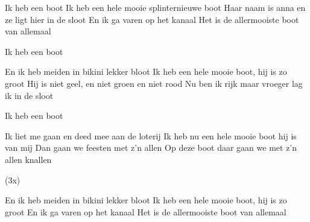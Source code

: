 
\begin{guitar}
	Ik heb een boot
	Ik heb een hele mooie splinternieuwe boot
	Haar naam is anna en ze ligt hier in de sloot
	En ik ga varen op het kanaal
	Het is de allermooiste boot van allemaal

	Ik heb een boot
	 

	En ik heb meiden in bikini lekker bloot
	Ik heb een hele mooie boot, hij is zo groot
	Hij is niet geel, en niet groen en niet rood
	Nu ben ik rijk maar vroeger lag ik in de sloot

	Ik heb een boot

	Ik liet me gaan en deed mee aan de loterij
	Ik heb nu een hele mooie boot hij is van mij
	Dan gaan we feesten met z'n allen
	Op deze boot daar gaan we met z'n allen knallen

	 (3x)

	En ik heb meiden in bikini lekker bloot
	Ik heb een hele mooie boot, hij is zo groot
	En ik ga varen op het kanaal
	Het is de allermooiste boot van allemaal
\end{guitar}

